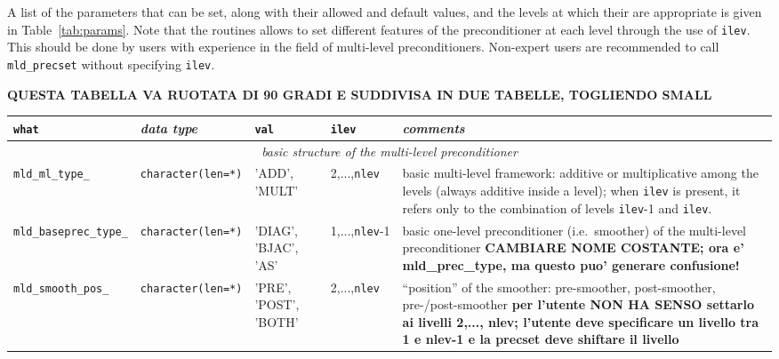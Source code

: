 A list of the parameters that can be set, along with their allowed and default values, and the levels
at which their are appropriate is given in Table~\ref{tab:params}. Note that the routines allows
to set different features of the preconditioner at each level through the use of \verb|ilev|.
This should be done by users with experience in the field of multi-level preconditioners.
Non-expert users are recommended to call \verb| mld_precset| without specifying \verb|ilev|. 


\begin{table}[p]
{\small
\begin{center}

\textbf{QUESTA TABELLA VA RUOTATA DI 90 GRADI E SUDDIVISA IN DUE TABELLE, TOGLIENDO SMALL}

\hspace*{-3cm}
\begin{tabular}{|l|l|p{1.5cm}|l|p{6cm}|}
\hline
\verb|what|              & \emph{data type}        &  \verb|val|      &  \verb|ilev|  & \emph{comments} \\ \hline
\multicolumn{5}{|c|}{\emph{basic structure of the multi-level preconditioner}}                          \\ \hline
\verb|mld_ml_type_|      & \verb|character(len=*)|
                         & 'ADD', 'MULT'   
                         &  2,...,\verb|nlev|
                         & basic multi-level framework: additive or multiplicative among the levels
                          (always additive inside a level); when \verb|ilev| is present, it refers
                          only to the combination of levels \verb|ilev|-1 and  \verb|ilev|.    \\  
\verb|mld_baseprec_type_|& \verb|character(len=*)|
                         & 'DIAG', 'BJAC', 'AS'
                         & 1,...,\verb|nlev|-1
                         & basic one-level preconditioner (i.e.\ smoother) of the multi-level
                           preconditioner \textbf{CAMBIARE NOME COSTANTE; ora e' mld\_prec\_type,
                           ma questo puo' generare confusione!}                                 \\
\verb|mld_smooth_pos_|   & \verb|character(len=*)|
                         & 'PRE', 'POST', 'BOTH'
                         & 2,...,\verb|nlev|
                         & ``position'' of the smoother: pre-smoother, post-smoother, pre-/post-smoother
                           \textbf{per l'utente NON HA SENSO settarlo ai livelli 2,..., nlev; l'utente
                           deve specificare un livello tra 1 e nlev-1 e la precset deve shiftare il livello
}
\end{tabular}
\end{center}}
\end{table}
